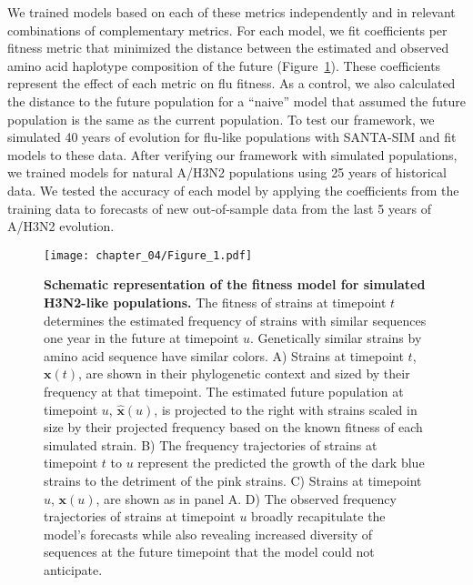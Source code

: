 We trained models based on each of these metrics independently and in relevant combinations of complementary metrics.
For each model, we fit coefficients per fitness metric that minimized the distance between the estimated and observed amino acid haplotype composition of the future (Figure~\ref{fig:model}).
These coefficients represent the effect of each metric on flu fitness.
As a control, we also calculated the distance to the future population for a ``naive'' model that assumed the future population is the same as the current population.
To test our framework, we simulated 40 years of evolution for flu-like populations with SANTA-SIM and fit models to these data.
After verifying our framework with simulated populations, we trained models for natural A/H3N2 populations using 25 years of historical data.
We tested the accuracy of each model by applying the coefficients from the training data to forecasts of new out-of-sample data from the last 5 years of A/H3N2 evolution.

\begin{figure}
  \begin{center}
  \texttt{[image: chapter\_04/Figure\_1.pdf]}
  \caption[{Schematic representation of the fitness model for simulated H3N2-like populations.}]{
    {\bf Schematic representation of the fitness model for simulated H3N2-like populations.}
    The fitness of strains at timepoint $t$ determines the estimated frequency of strains with similar sequences one year in the future at timepoint $u$.
    Genetically similar strains by amino acid sequence have similar colors.
    A) Strains at timepoint $t$, $\mathbf{x}(t)$, are shown in their phylogenetic context and sized by their frequency at that timepoint.
    The estimated future population at timepoint $u$, $\mathbf{\hat{x}}(u)$, is projected to the right with strains scaled in size by their projected frequency based on the known fitness of each simulated strain.
    B) The frequency trajectories of strains at timepoint $t$ to $u$ represent the predicted the growth of the dark blue strains to the detriment of the pink strains.
    C) Strains at timepoint $u$, $\mathbf{x}(u)$, are shown as in panel A.
    D) The observed frequency trajectories of strains at timepoint $u$ broadly recapitulate the model's forecasts while also revealing increased diversity of sequences at the future timepoint that the model could not anticipate.
  }
  \label{fig:model}
  \end{center}
\end{figure}

